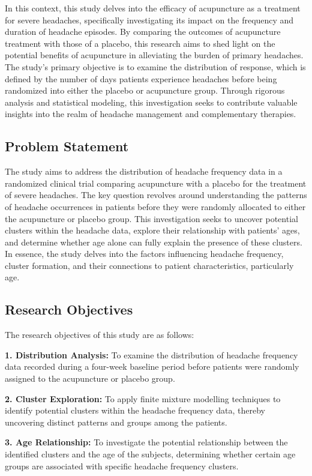 \documentclass[a4paper, 12pt]{article}
\begin{document}
In this context, this study delves into the efficacy of acupuncture as a treatment for severe headaches, specifically investigating its impact on the frequency and duration of headache episodes. By comparing the outcomes of acupuncture treatment with those of a placebo, this research aims to shed light on the potential benefits of acupuncture in alleviating the burden of primary headaches. The study's primary objective is to examine the distribution of response, which is defined by the number of days patients experience headaches before being randomized into either the placebo or acupuncture group. Through rigorous analysis and statistical modeling, this investigation seeks to contribute valuable insights into the realm of headache management and complementary therapies.

    \subsection{Problem Statement}
The study aims to address the distribution of headache frequency data in a randomized clinical trial comparing acupuncture with a placebo for the treatment of severe headaches. The key question revolves around understanding the patterns of headache occurrences in patients before they were randomly allocated to either the acupuncture or placebo group. This investigation seeks to uncover potential clusters within the headache data, explore their relationship with patients' ages, and determine whether age alone can fully explain the presence of these clusters. In essence, the study delves into the factors influencing headache frequency, cluster formation, and their connections to patient characteristics, particularly age.

    \subsection{Research Objectives}
The research objectives of this study are as follows:

\textbf{1. Distribution Analysis:} To examine the distribution of headache frequency data recorded during a four-week baseline period before patients were randomly assigned to the acupuncture or placebo group.

\textbf{2. Cluster Exploration:} To apply finite mixture modelling techniques to identify potential clusters within the headache frequency data, thereby uncovering distinct patterns and groups among the patients.

\textbf{3. Age Relationship:} To investigate the potential relationship between the identified clusters and the age of the subjects, determining whether certain age groups are associated with specific headache frequency clusters.
\end{document}

